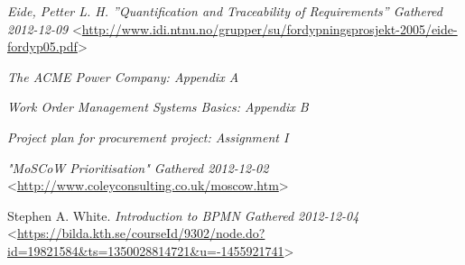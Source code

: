 \begin{thebibliography}{99}     
	

 \emph{Eide, Petter L. H. \textsl{''Quantification and Traceability of Requirements''} Gathered 2012-12-09 } <\url{http://www.idi.ntnu.no/grupper/su/fordypningsprosjekt-2005/eide-fordyp05.pdf}>


 \emph{The ACME Power Company: Appendix A}

 \emph{Work Order Management Systems Basics: Appendix B}

 \emph{Project plan for procurement project: Assignment I}

 \emph{\textsl{"MoSCoW Prioritisation"} Gathered 2012-12-02} <\url{http://www.coleyconsulting.co.uk/moscow.htm}>

 Stephen A. White. \textsl{Introduction to BPMN Gathered 2012-12-04} <\url{https://bilda.kth.se/courseId/9302/node.do?id=19821584&ts=1350028814721&u=-1455921741}> 

\end{thebibliography}